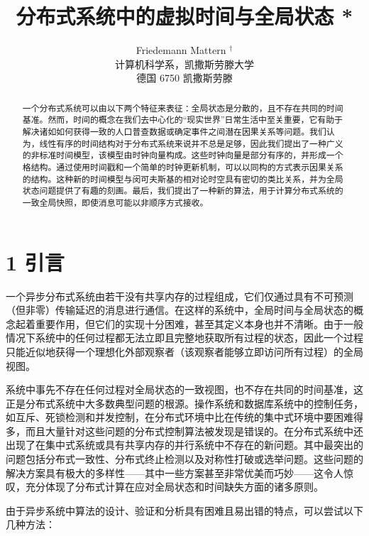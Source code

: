 \documentclass[12pt,a4paper]{report} %
\begin{document}
\title{分布式系统中的虚拟时间与全局状态 *}

\author{Friedemann Mattern ${ }^{\dagger}$ \\ 计算机科学系，凯撒斯劳滕大学 \\ 德国 6750 凯撒斯劳滕}

\maketitle
\begin{abstract}

一个分布式系统可以由以下两个特征来表征：全局状态是分散的，且不存在共同的时间基准。然而，时间的概念在我们去中心化的“现实世界”日常生活中至关重要，它有助于解决诸如如何获得一致的人口普查数据或确定事件之间潜在因果关系等问题。我们认为，线性有序的时间结构对于分布式系统来说并不总是足够，因此我们提出了一种广义的非标准时间模型，该模型由时钟向量构成。这些时钟向量是部分有序的，并形成一个格结构。通过使用时间戳和一个简单的时钟更新机制，可以以同构的方式表示因果关系的结构。这种新的时间模型与闵可夫斯基的相对论时空具有密切的类比关系，并为全局状态问题提供了有趣的刻画。最后，我们提出了一种新的算法，用于计算分布式系统的一致全局快照，即使消息可能以非顺序方式接收。\end{abstract}

\section*{1 引言}

一个异步分布式系统由若干没有共享内存的过程组成，它们仅通过具有不可预测（但非零）传输延迟的消息进行通信。在这样的系统中，全局时间与全局状态的概念起着重要作用，但它们的实现十分困难，甚至其定义本身也并不清晰。由于一般情况下系统中的任何过程都无法立即且完整地获取所有过程的状态，因此一个过程只能近似地获得一个理想化外部观察者（该观察者能够立即访问所有过程）的全局视图。

系统中事先不存在任何过程对全局状态的一致视图，也不存在共同的时间基准，这正是分布式系统中大多数典型问题的根源。操作系统和数据库系统中的控制任务，如互斥、死锁检测和并发控制，在分布式环境中比在传统的集中式环境中要困难得多，而且大量针对这些问题的分布式控制算法被发现是错误的。在分布式系统中还出现了在集中式系统或具有共享内存的并行系统中不存在的新问题。其中最突出的问题包括分布式一致性、分布式终止检测以及对称性打破或选举问题。这些问题的解决方案具有极大的多样性——其中一些方案甚至非常优美而巧妙——这令人惊叹，充分体现了分布式计算在应对全局状态和时间缺失方面的诸多原则。

由于异步系统中算法的设计、验证和分析具有困难且易出错的特点，可以尝试以下几种方法：
\end{document}
